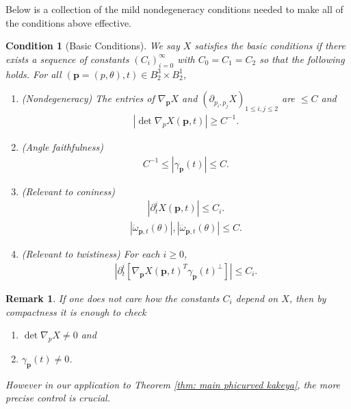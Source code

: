\documentclass[12pt]{amsart}
\numberwithin{equation}{section}
\newtheorem{remark}[lemma]{Remark}
\newtheorem{condition}{Condition}
\newcommand{\1}{\mathbbm{1}}
\newcommand{\p}{\mathbf p}
\begin{document}
Below is a collection of the mild nondegeneracy conditions needed to make all of the conditions above effective.

\begin{condition}[Basic Conditions]\label{cond: basic}
    We say $X$ satisfies the basic conditions if there exists a sequence of constants $(C_i)_{i=0}^\infty$ with $C_0 = C_1 = C_2$ so that the following holds. For all $(\p=(p,\theta),t) \in B_2^3 \times B_2^1$, 
    \begin{enumerate}
        \item \label{cond: basic nondeg}(Nondegeneracy) The entries of $\nabla_\p X$ and $(\partial_{p_i,p_j} X)_{1\leq i,j \leq 2}$ are $\leq C$ and 
        \begin{align}
            |\det \nabla_p X(\p,t)| \geq C^{-1}. 
        \end{align}
        \item \label{cond: basic angle}(Angle faithfulness)
        \begin{align}
            C^{-1} \leq |\gamma_\p(t)| \leq C.
        \end{align}
        \item \label{cond: basic coniness}(Relevant to coniness)
        \begin{align}
            |\partial_t^i X(\p,t)| \leq C_i.
        \end{align}
        \begin{align}
            |\ddot \omega_{\p,t}(\theta)|, |\dddot \omega_{\p,t}(\theta)|  \leq C.
        \end{align}
        \item \label{cond: basic twistiness}(Relevant to twistiness)
        For each $i \geq 0$, 
        \begin{align}
            |\partial_t^i[\nabla_{\p} X(\p,t)^T \gamma_\p(t)^\perp]| \leq C_i.
        \end{align}
    \end{enumerate}
\end{condition}

\begin{remark}
    If one does not care how the constants $C_i$ depend on $X$, then by compactness it is enough to check 
    \begin{enumerate}
        \item $\det \nabla_p X \neq 0$ and 
        \item $\gamma_{\p}(t) \neq 0$.
    \end{enumerate}
    However in our application to Theorem \ref{thm: main phicurved kakeya}, the more precise control is crucial. 
\end{remark}
\end{document}
